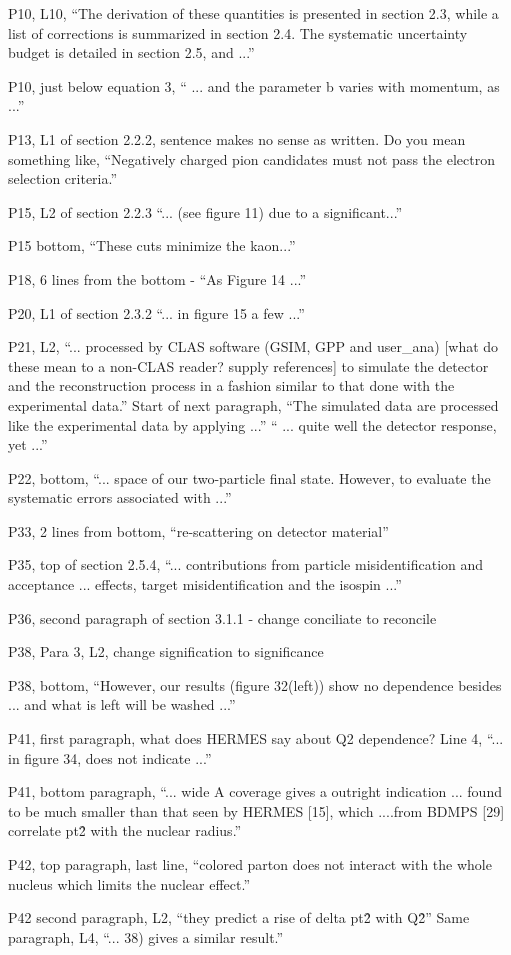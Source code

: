 \documentclass[12pt]{article}
\begin{document}
P10, L10, “The derivation of these quantities is presented in section 2.3, while a list of 
corrections  is summarized in section 2.4.  The systematic uncertainty budget is detailed in 
section 2.5, and ...”

P10, just below equation 3, “ ... and the parameter b varies with momentum, as ...”

P13, L1 of section 2.2.2, sentence makes no sense as written. Do you mean something like, 
“Negatively charged pion candidates must not pass the electron selection criteria.”

P15, L2 of section 2.2.3 “... (see figure 11) due to a significant...”

P15 bottom, “These cuts minimize the kaon...”

P18, 6 lines from the bottom - “As Figure 14 ...”

P20, L1 of section 2.3.2 “... in figure 15 a few ...”

P21, L2, “... processed by CLAS software (GSIM, GPP and user\_ana) [what do these mean to a 
non-CLAS reader? supply references] to simulate the detector and the reconstruction process in 
a fashion similar to that done with the experimental data.”
Start of next paragraph, “The simulated data are processed like the experimental data by 
applying ...”  “ ... quite well the detector response, yet ...”

P22, bottom, “... space of our two-particle final state.  However, to evaluate the systematic 
errors associated with ...”

P33, 2 lines from bottom, “re-scattering on detector material”

P35, top of section 2.5.4, “... contributions from particle misidentification and acceptance ... 
effects, target misidentification and the isospin ...”

P36, second paragraph of section 3.1.1 -
 change conciliate to reconcile

P38, Para 3, L2, change signification to significance

P38, bottom, “However, our results (figure 32(left)) show no dependence besides ... and what is 
left will be washed ...”

P41, first paragraph, what does HERMES say about Q2 dependence?  Line 4, “... in figure 34, 
does not indicate ...”

P41, bottom paragraph, “... wide A coverage gives a outright indication ... found to be much 
smaller than that seen by HERMES [15], which ....from BDMPS [29] correlate pt\^2 with the 
nuclear radius.”

P42, top paragraph, last line, “colored parton does not interact with the whole nucleus which 
limits the nuclear effect.”

P42 second paragraph, L2, “they predict a rise of delta pt\^2 with Q\^2”
Same paragraph, L4, “... 38) gives a similar result.”
\end{document}
